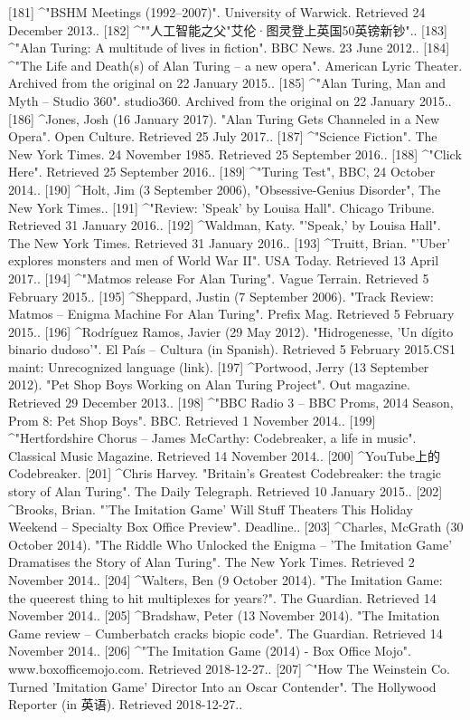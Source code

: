[181]
^"BSHM Meetings (1992–2007)". University of Warwick. Retrieved 24 December 2013..
[182]
^""人工智能之父"艾伦·图灵登上英国50英镑新钞"..
[183]
^"Alan Turing: A multitude of lives in fiction". BBC News. 23 June 2012..
[184]
^"The Life and Death(s) of Alan Turing – a new opera". American Lyric Theater. Archived from the original on 22 January 2015..
[185]
^"Alan Turing, Man and Myth – Studio 360". studio360. Archived from the original on 22 January 2015..
[186]
^Jones, Josh (16 January 2017). "Alan Turing Gets Channeled in a New Opera". Open Culture. Retrieved 25 July 2017..
[187]
^"Science Fiction". The New York Times. 24 November 1985. Retrieved 25 September 2016..
[188]
^"Click Here". Retrieved 25 September 2016..
[189]
^"Turing Test", BBC, 24 October 2014..
[190]
^Holt, Jim (3 September 2006), "Obsessive-Genius Disorder", The New York Times..
[191]
^"Review: 'Speak' by Louisa Hall". Chicago Tribune. Retrieved 31 January 2016..
[192]
^Waldman, Katy. "'Speak,' by Louisa Hall". The New York Times. Retrieved 31 January 2016..
[193]
^Truitt, Brian. "'Uber' explores monsters and men of World War II". USA Today. Retrieved 13 April 2017..
[194]
^"Matmos release For Alan Turing". Vague Terrain. Retrieved 5 February 2015..
[195]
^Sheppard, Justin (7 September 2006). "Track Review: Matmos – Enigma Machine For Alan Turing". Prefix Mag. Retrieved 5 February 2015..
[196]
^Rodríguez Ramos, Javier (29 May 2012). "Hidrogenesse, 'Un dígito binario dudoso'". El País – Cultura (in Spanish). Retrieved 5 February 2015.CS1 maint: Unrecognized language (link).
[197]
^Portwood, Jerry (13 September 2012). "Pet Shop Boys Working on Alan Turing Project". Out magazine. Retrieved 29 December 2013..
[198]
^"BBC Radio 3 – BBC Proms, 2014 Season, Prom 8: Pet Shop Boys". BBC. Retrieved 1 November 2014..
[199]
^"Hertfordshire Chorus – James McCarthy: Codebreaker, a life in music". Classical Music Magazine. Retrieved 14 November 2014..
[200]
^YouTube上的Codebreaker.
[201]
^Chris Harvey. "Britain's Greatest Codebreaker: the tragic story of Alan Turing". The Daily Telegraph. Retrieved 10 January 2015..
[202]
^Brooks, Brian. "'The Imitation Game' Will Stuff Theaters This Holiday Weekend – Specialty Box Office Preview". Deadline..
[203]
^Charles, McGrath (30 October 2014). "The Riddle Who Unlocked the Enigma – 'The Imitation Game' Dramatises the Story of Alan Turing". The New York Times. Retrieved 2 November 2014..
[204]
^Walters, Ben (9 October 2014). "The Imitation Game: the queerest thing to hit multiplexes for years?". The Guardian. Retrieved 14 November 2014..
[205]
^Bradshaw, Peter (13 November 2014). "The Imitation Game review – Cumberbatch cracks biopic code". The Guardian. Retrieved 14 November 2014..
[206]
^"The Imitation Game (2014) - Box Office Mojo". www.boxofficemojo.com. Retrieved 2018-12-27..
[207]
^"How The Weinstein Co. Turned 'Imitation Game' Director Into an Oscar Contender". The Hollywood Reporter (in 英语). Retrieved 2018-12-27..